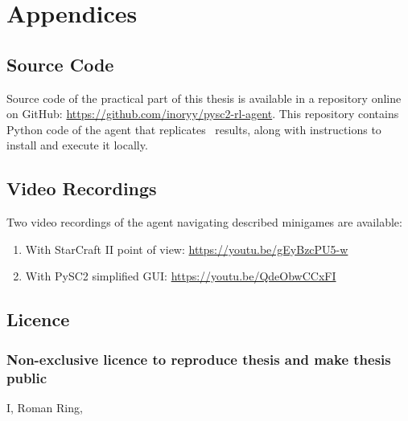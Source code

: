 \chapter*{Appendices}

\section*{Source Code}

Source code of the practical part of this thesis is available in a repository online on GitHub: \url{https://github.com/inoryy/pysc2-rl-agent}. This repository contains Python code of the agent that replicates~\cite{Vinyals2017} results, along with instructions to install and execute it locally.

\section*{Video Recordings}

Two video recordings of the agent navigating described minigames are available:

\begin{enumerate}
    \item With StarCraft II point of view: \url{https://youtu.be/gEyBzcPU5-w}
    \item With PySC2 simplified GUI: \url{https://youtu.be/QdeObwCCxFI}
\end{enumerate}

\newpage

\section*{Licence}

\subsection*{Non-exclusive licence to reproduce thesis and make thesis public}

I, Roman Ring,

